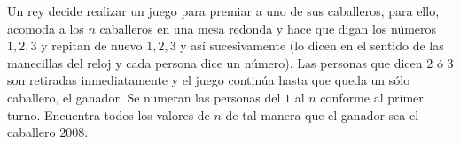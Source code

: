 Un rey decide realizar un juego para premiar a uno de sus caballeros, para ello, acomoda
a los $n$ caballeros en una mesa redonda y hace que digan los números $1, 2, 3$ y repitan de
nuevo $1, 2, 3$ y así sucesivamente (lo dicen en el sentido de las manecillas del reloj y cada
persona dice un número). Las personas que dicen $2$ ó $3$ son retiradas inmediatamente y
el juego continúa hasta que queda un sólo caballero, el ganador. Se numeran las personas
del $1$ al $n$ conforme al primer turno.
Encuentra todos los valores de $n$ de tal manera que el ganador sea el caballero $2008$.
